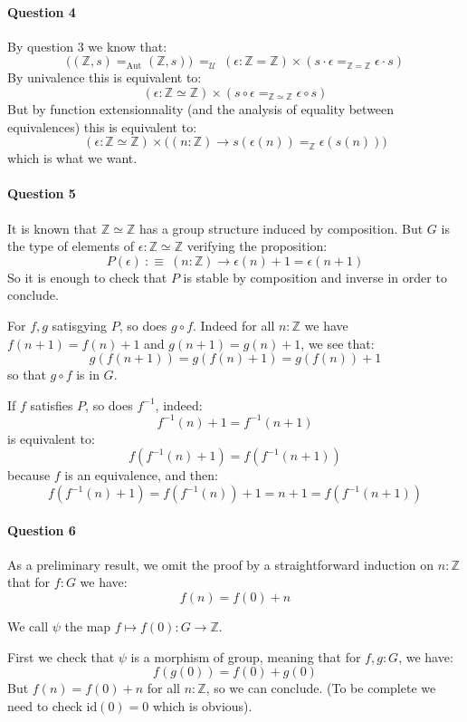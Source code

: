 \documentclass{article}[6pt]%
\newcommand{\id}{\mathrm{id}}
\begin{document}
\paragraph{Question 4} 
By question 3 we know that:
\[\big((\mathbb{Z},s)=_{\mathrm{Aut}} (\mathbb{Z},s)\big) \ =_{\mathcal U} \ (\epsilon : \mathbb{Z} = \mathbb{Z})\times (s\cdot \epsilon =_{\mathbb{Z} = \mathbb{Z}} \epsilon\cdot s)\] 
By univalence this is equivalent to:
\[(\epsilon : \mathbb{Z}\simeq\mathbb{Z})\times (s\circ \epsilon =_{\mathbb{Z}\simeq\mathbb{Z}} \epsilon\circ s) \]
But by function extensionnality (and the analysis of equality between equivalences) this is equivalent to:
\[(\epsilon : \mathbb{Z}\simeq\mathbb{Z})\times \big( (n:\mathbb{Z}) \rightarrow s(\epsilon(n)) =_{\mathbb{Z}}\epsilon(s(n)) \big)\]
which is what we want.

\paragraph{Question 5} 
It is known that $\mathbb{Z}\simeq\mathbb{Z}$ has a group structure induced by composition. But $G$ is the type of elements of $\epsilon : \mathbb{Z}\simeq\mathbb{Z}$ verifying the proposition: 
\[P(\epsilon) \ :\equiv\ (n:\mathbb{Z}) \rightarrow \epsilon(n)+1 = \epsilon(n+1)\]
 So it is enough to check that $P$ is stable by composition and inverse in order to conclude.%

For $f,g$ satisgying $P$, so does $g\circ f$. Indeed for all $n:\mathbb{Z}$ we have $f(n+1) = f(n)+1$ and $g(n+1) = g(n)+1$, we see that:
\[g(f(n+1)) = g(f(n)+1) = g(f(n)) +1\]
so that $g\circ f$ is in $G$.

If $f$ satisfies $P$, so does $f^{-1}$, indeed: 
\[f^{-1}(n)+1 = f^{-1}(n+1)\] 
is equivalent to:
\[f(f^{-1}(n)+1) = f(f^{-1}(n+1))\] 
because $f$ is an equivalence, and then:
\[ f(f^{-1}(n)+1) = f(f^{-1}(n)) +1 = n+1 = f(f^{-1}(n+1))\]



\paragraph{Question 6}
As a preliminary result, we omit the proof by a straightforward induction on $n:\mathbb{Z}$ that for $f:G$ we have:
\[f(n) = f(0) + n\]

We call $\psi$ the map $f\mapsto f(0) : G\rightarrow \mathbb{Z}$. 

First we check that $\psi$ is a morphism of group, meaning that for $f,g:G$, we have:
\[f(g(0)) = f(0) + g(0)\]
But $f(n) = f(0)+n$ for all $n:\mathbb{Z}$, so we can conclude. (To be complete we need to check $\id(0) = 0$ which is obvious).
\end{document}
